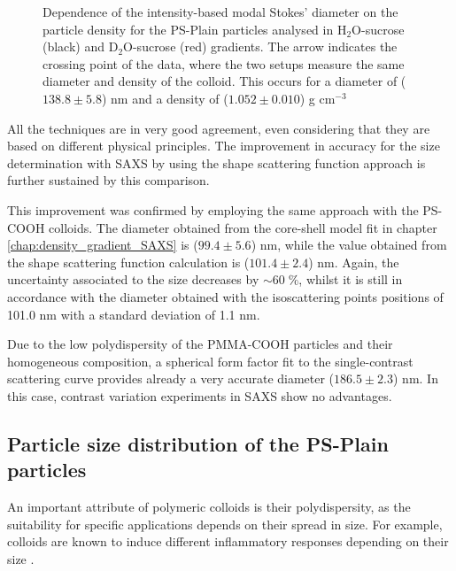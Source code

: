 \begin{figure*}
	\begin{center}
		
	\end{center}
	\caption[Simultaneous size and density determination of the PS-Plain particles with a DCS combined approach.]{Dependence of the intensity-based modal Stokes' diameter on the particle density for the PS-Plain particles analysed in H$_2$O-sucrose (black) and D$_2$O-sucrose (red) gradients. The arrow indicates the crossing point of the data, where the two setups measure the same diameter and density of the colloid. This occurs for a diameter of ($138.8\pm5.8$) nm and a density of ($1.052\pm0.010$) g cm$^{-3}$}
	\label{fig:DCSCombinedStokes}
\end{figure*}

All the techniques are in very good agreement, even considering that they are based on different physical principles. The improvement in accuracy for the size determination with SAXS by using the shape scattering function approach is further sustained by this comparison. 

This improvement was confirmed by employing the same approach with the PS-COOH colloids. The diameter obtained from the core-shell model fit in chapter \ref{chap:density_gradient_SAXS} is ($99.4\pm5.6$) nm, while the value obtained from the shape scattering function calculation is ($101.4\pm2.4$) nm. Again, the uncertainty associated to the size decreases by $\sim 60\;\%$, whilst it is still in accordance with the diameter obtained with the isoscattering points positions of 101.0 nm with a standard deviation of 1.1 nm. 

Due to the low polydispersity of the PMMA-COOH particles and their homogeneous composition, a spherical form factor fit to the single-contrast scattering curve provides already a very accurate diameter ($186.5\pm2.3$) nm. In this case, contrast variation experiments in SAXS show no advantages.

\subsection{Particle size distribution of the PS-Plain particles}

An important attribute of polymeric colloids is their polydispersity, as the suitability for specific applications depends on their spread in size. For example, colloids are known to induce different inflammatory responses depending on their size \citep{kusaka_effect_2014}.

